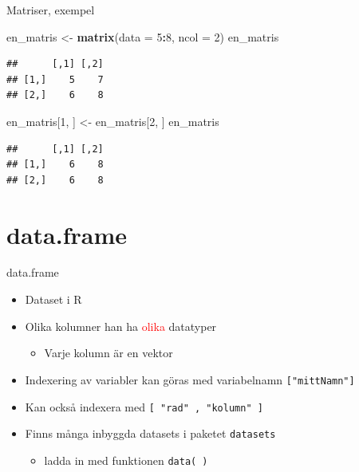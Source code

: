 \documentclass[
  11pt,
  ignorenonframetext,
]{beamer}
\newenvironment{Shaded}{\begin{snugshade}}{\end{snugshade}}
\newcommand{\DataTypeTok}[1]{\textcolor[rgb]{0.13,0.29,0.53}{#1}}
\newcommand{\DecValTok}[1]{\textcolor[rgb]{0.00,0.00,0.81}{#1}}
\newcommand{\KeywordTok}[1]{\textcolor[rgb]{0.13,0.29,0.53}{\textbf{#1}}}
\newcommand{\NormalTok}[1]{#1}
\newcommand{\OperatorTok}[1]{\textcolor[rgb]{0.81,0.36,0.00}{\textbf{#1}}}
\newcommand{\StringTok}[1]{\textcolor[rgb]{0.31,0.60,0.02}{#1}}
\providecommand{\tightlist}{%
  \setlength{\itemsep}{0pt}\setlength{\parskip}{0pt}}
\begin{document}
\begin{frame}[fragile]{Matriser, exempel}
\protect\hypertarget{matriser-exempel}{}
\begin{Shaded}
\begin{Highlighting}[]
\NormalTok{en\_matris \textless{}{-}}\StringTok{ }\KeywordTok{matrix}\NormalTok{(}\DataTypeTok{data =} \DecValTok{5}\OperatorTok{:}\DecValTok{8}\NormalTok{, }\DataTypeTok{ncol =} \DecValTok{2}\NormalTok{)}
\NormalTok{en\_matris}
\end{Highlighting}
\end{Shaded}

\begin{verbatim}
##      [,1] [,2]
## [1,]    5    7
## [2,]    6    8
\end{verbatim}

\pause

\begin{Shaded}
\begin{Highlighting}[]
\NormalTok{en\_matris[}\DecValTok{1}\NormalTok{, ] \textless{}{-}}\StringTok{ }\NormalTok{en\_matris[}\DecValTok{2}\NormalTok{, ]}
\NormalTok{en\_matris}
\end{Highlighting}
\end{Shaded}

\begin{verbatim}
##      [,1] [,2]
## [1,]    6    8
## [2,]    6    8
\end{verbatim}
\end{frame}

\hypertarget{data.frame}{%
\section{data.frame}\label{data.frame}}

\begin{frame}{data.frame}
\protect\hypertarget{data.frame-1}{}
\begin{itemize}
\tightlist
\item
  Dataset i R
\item
  Olika kolumner han ha \textcolor{red}{olika} datatyper

  \begin{itemize}
  \tightlist
  \item
    Varje kolumn är en vektor
  \end{itemize}
\item
  Indexering av variabler kan göras med variabelnamn
  \texttt{["mittNamn"]}
\item
  Kan också indexera med \texttt{[ "rad" , "kolumn" ]}
\item
  Finns många inbyggda datasets i paketet \texttt{datasets}

  \begin{itemize}
  \tightlist
  \item
    ladda in med funktionen \texttt{data( )}
  \end{itemize}
\end{itemize}
\end{frame}
\end{document}
